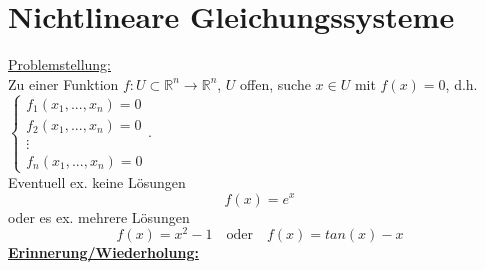 \documentclass[12pt]{article}
\theoremstyle{break}
\begin{document}
\section{Nichtlineare Gleichungssysteme}
\underline{Problemstellung:}\\
Zu einer Funktion $f\colon U \subset \mathbb{R}^n \rightarrow \mathbb{R}^n$, $U$ offen, suche $x \in U$ mit $f(x) = 0$, d.h. $\left\{ \begin{matrix} f_1(x_1, ..., x_n) = 0 \\ f_2(x_1, ..., x_n) = 0 \\ \vdots \\ f_n(x_1, ...,x_n) = 0 \end{matrix} \right.$.\\
Eventuell ex. keine Lösungen
$$f(x) = e^x$$
oder es ex. mehrere Lösungen
$$f(x) = x^2-1 \quad \text{oder} \quad f(x) = tan(x) - x$$
%
\underline{\textbf{Erinnerung/Wiederholung:}}
%
\end{document}
